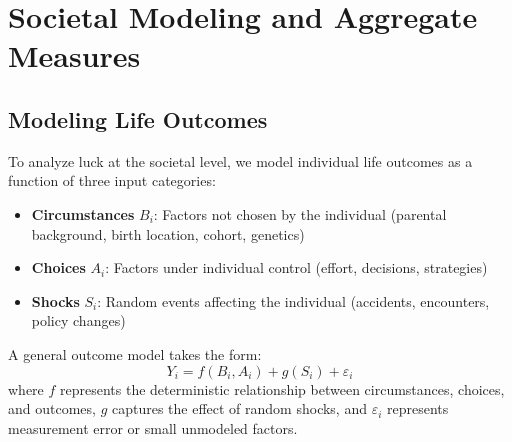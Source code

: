   \section{Societal Modeling and Aggregate Measures}
  \label{sec:society}

  \subsection{Modeling Life Outcomes}

  To analyze luck at the societal level, we model individual life
  outcomes as a function of three input categories:

  \begin{itemize}
    \item \textbf{Circumstances} $B_{i}$: Factors not chosen by the individual
      (parental background, birth location, cohort, genetics)

    \item \textbf{Choices} $A_{i}$: Factors under individual control (effort,
      decisions, strategies)

    \item \textbf{Shocks} $S_{i}$: Random events affecting the individual
      (accidents, encounters, policy changes)
  \end{itemize}

  A general outcome model takes the form:
  \begin{equation}
    Y_{i} = f(B_{i}, A_{i}) + g(S_{i}) + \varepsilon_{i}
  \end{equation}
  where $f$ represents the deterministic relationship between
  circumstances, choices, and outcomes, $g$ captures the effect of random
  shocks, and $\varepsilon_{i}$ represents measurement error or small
  unmodeled factors.

